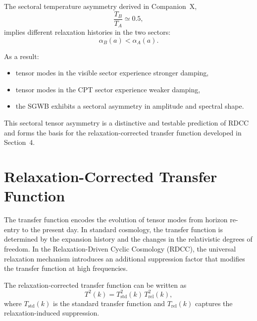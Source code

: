 \documentclass[11pt,a4paper]{article}
\begin{document}
The sectoral temperature asymmetry derived in Companion~X,
\begin{equation}
\frac{T_{B}}{T_{A}} \simeq 0.5,
\end{equation}
implies different relaxation histories in the two sectors:
\begin{equation}
\alpha_{B}(a) < \alpha_{A}(a).
\end{equation}

As a result:

\begin{itemize}
\item tensor modes in the visible sector experience stronger damping,
\item tensor modes in the CPT sector experience weaker damping,
\item the SGWB exhibits a sectoral asymmetry in amplitude and spectral shape.
\end{itemize}

This sectoral tensor asymmetry is a distinctive and testable prediction of RDCC and forms the
basis for the relaxation-corrected transfer function developed in Section~4.


\section{Relaxation-Corrected Transfer Function}

The transfer function encodes the evolution of tensor modes from horizon re-entry to the
present day. In standard cosmology, the transfer function is determined by the expansion
history and the changes in the relativistic degrees of freedom. In the Relaxation-Driven Cyclic
Cosmology (RDCC), the universal relaxation mechanism introduces an additional suppression
factor that modifies the transfer function at high frequencies.

The relaxation-corrected transfer function can be written as
\begin{equation}
T^{2}(k)
=
T_{\mathrm{std}}^{2}(k)\,
T_{\mathrm{rel}}^{2}(k),
\end{equation}
where \(T_{\mathrm{std}}(k)\) is the standard transfer function and \(T_{\mathrm{rel}}(k)\) captures the
relaxation-induced suppression.

\end{document}
